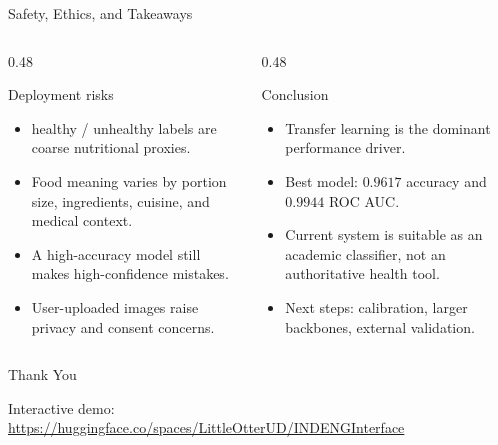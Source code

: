 \documentclass[10pt,xcolor={table,dvipsnames},t]{beamer}
\newcommand{\healthy}{healthy}
\newcommand{\unhealthy}{unhealthy}
\begin{document}
\begin{frame}{Safety, Ethics, and Takeaways}
\footnotesize
\begin{columns}[T]
\begin{column}{0.48\textwidth}
\begin{block}{Deployment risks}
\begin{itemize}
  \item \healthy{} / \unhealthy{} labels are coarse nutritional proxies.
  \item Food meaning varies by portion size, ingredients, cuisine, and medical context.
  \item A high-accuracy model still makes high-confidence mistakes.
  \item User-uploaded images raise privacy and consent concerns.
\end{itemize}
\end{block}
\end{column}
\begin{column}{0.48\textwidth}
\begin{block}{Conclusion}
\begin{itemize}
  \item Transfer learning is the dominant performance driver.
  \item Best model: \(0.9617\) accuracy and \(0.9944\) ROC AUC.
  \item Current system is suitable as an academic classifier, not an authoritative health tool.
  \item Next steps: calibration, larger backbones, external validation.
\end{itemize}
\end{block}
\end{column}
\end{columns}
\end{frame}

\normalframetitle
\begin{frame}
\centering
\vspace{0.18\textheight}
{\Huge Thank You}

\vspace{1.5em}
{\footnotesize Interactive demo: \url{https://huggingface.co/spaces/LittleOtterUD/INDENGInterface}}
\end{frame}
\end{document}
